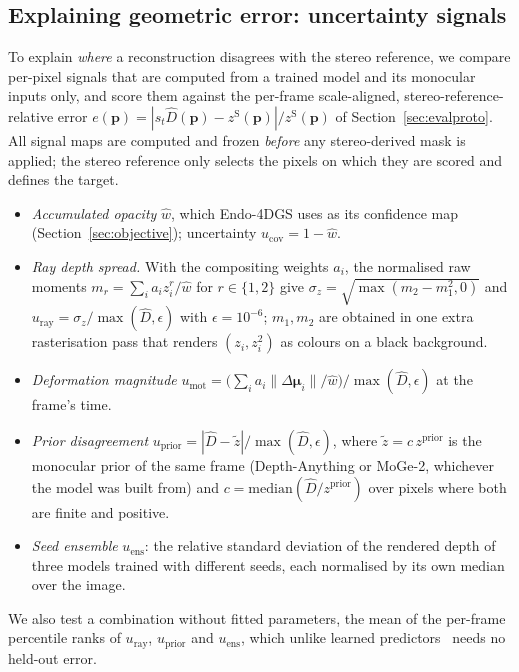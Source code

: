 
\subsection{Explaining geometric error: uncertainty signals}
\label{sec:unc_method}
To explain \emph{where} a reconstruction disagrees with the stereo reference, we compare per-pixel signals that are computed from a trained model and its monocular inputs only, and score them against the per-frame scale-aligned, stereo-reference-relative error $e(\mathbf{p})=|s_t\hat{D}(\mathbf{p})-z^{\mathrm{S}}(\mathbf{p})|/z^{\mathrm{S}}(\mathbf{p})$ of Section~\ref{sec:evalproto}. All signal maps are computed and frozen \emph{before} any stereo-derived mask is applied; the stereo reference only selects the pixels on which they are scored and defines the target.
\begin{itemize}
\item \emph{Accumulated opacity} $\hat{w}$, which Endo-4DGS uses as its confidence map (Section~\ref{sec:objective}); uncertainty $u_{\mathrm{cov}}=1-\hat{w}$.
\item \emph{Ray depth spread.} With the compositing weights $a_i$, the normalised raw moments $m_r=\sum_i a_i z_i^r/\hat{w}$ for $r\in\{1,2\}$ give $\sigma_z=\sqrt{\max(m_2-m_1^2,0)}$ and $u_{\mathrm{ray}}=\sigma_z/\max(\hat{D},\epsilon)$ with $\epsilon=10^{-6}$; $m_1, m_2$ are obtained in one extra rasterisation pass that renders $(z_i, z_i^2)$ as colours on a black background.
\item \emph{Deformation magnitude} $u_{\mathrm{mot}}=\big(\sum_i a_i\|\Delta\bm{\mu}_i\|/\hat{w}\big)/\max(\hat{D},\epsilon)$ at the frame's time.
\item \emph{Prior disagreement} $u_{\mathrm{prior}}=|\hat{D}-\tilde{z}|/\max(\hat{D},\epsilon)$, where $\tilde{z}=c\,z^{\mathrm{prior}}$ is the monocular prior of the same frame (Depth-Anything or MoGe-2, whichever the model was built from) and $c=\mathrm{median}(\hat{D}/z^{\mathrm{prior}})$ over pixels where both are finite and positive.
\item \emph{Seed ensemble} $u_{\mathrm{ens}}$: the relative standard deviation of the rendered depth of three models trained with different seeds, each normalised by its own median over the image.
\end{itemize}
We also test a combination without fitted parameters, the mean of the per-frame percentile ranks of $u_{\mathrm{ray}}$, $u_{\mathrm{prior}}$ and $u_{\mathrm{ens}}$, which unlike learned predictors~\cite{gottwald2025primu} needs no held-out error.

